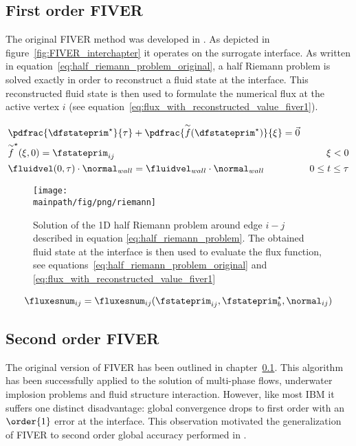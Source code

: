 \documentclass[../main.tex]{subfiles}
\begin{document}
\subsection{First order \ac{FIVER}}\label{sec:fiver-1}
The original \ac{FIVER} method was developed in \cite{Farhat2008}. As depicted in figure~\ref{fig:FIVER_interchapter} it operates on the surrogate interface. As written in equation~\eqref{eq:half_riemann_problem_original}, a half Riemann problem is solved exactly in order to reconstruct a fluid state at the interface. This reconstructed fluid state is then used to formulate the numerical flux at the active vertex $i$ (see equation~\eqref{eq:flux_with_reconstructed_value_fiver1}).


\begin{align}\label{eq:half_riemann_problem_original}
&\pdfrac{\dfstateprim^{\star}}{\tau} + \pdfrac{\overset{\sim}{f}(\dfstateprim^{\star})}{\xi} = \vec{0} & \nonumber\\
&\overset{\sim}{f}^{\star}(\xi,0)=\fstateprim_{ij}                                                     & \xi<0 \nonumber\\
&\fluidvel(0,\tau)\cdot \normal_{wall} = \fluidvel_{wall}\cdot\normal_{wall}                          & 0\leq t \leq \tau
\end{align}

\begin{figure}[h!]
	\begin{center}
        \texttt{[image: \\mainpath/fig/png/riemann]}
        \caption[Riemann problem setup]{Solution of the 1D half Riemann problem around edge $i-j$ described in equation \eqref{eq:half_riemann_problem}. The obtained fluid state at the interface is then used to evaluate the flux function, see equations~\eqref{eq:half_riemann_problem_original} and \eqref{eq:flux_with_reconstructed_value_fiver1}}
		\label{fig:riemann_sketch}
    \end{center}
\end{figure}

\begin{align}\label{eq:flux_with_reconstructed_value_fiver1}
\fluxesnum_{ij}=\fluxesnum_{ij}(\fstateprim_{ij},\fstateprim^{\star}_b, \normal_{ij})
\end{align}



\subsection{Second order \ac{FIVER}}\label{sec:fiver-2}
The original version of \ac{FIVER} has been outlined in chapter~\ref{sec:fiver-1}. This algorithm has been successfully applied to the solution of multi-phase flows, underwater implosion problems and fluid structure interaction. However, like most \ac{IBM} it suffers one distinct disadvantage: global convergence drops to first order with an $\order{1}$ error at the interface. This observation motivated the generalization of FIVER to second order global accuracy performed in \cite{Main2014}.\\
\end{document}
